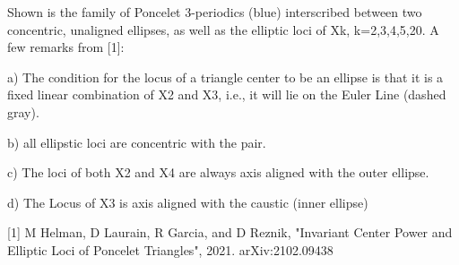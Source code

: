 Shown is the family of Poncelet 3-periodics (blue) interscribed between two concentric, unaligned ellipses, as well as the elliptic loci of Xk, k=2,3,4,5,20. A few remarks from [1]:

a) The condition for the locus of a triangle center to be an ellipse is that it is a fixed linear combination of X2 and X3, i.e., it will lie on the Euler Line (dashed gray).

b) all ellipstic loci are concentric with the pair.

c) The loci of both X2 and X4 are always axis aligned with the outer ellipse. 

d) The Locus of X3 is axis aligned with the caustic (inner ellipse)

[1] M Helman, D Laurain, R Garcia, and D Reznik, "Invariant Center Power and Elliptic Loci of Poncelet Triangles", 2021. arXiv:2102.09438
